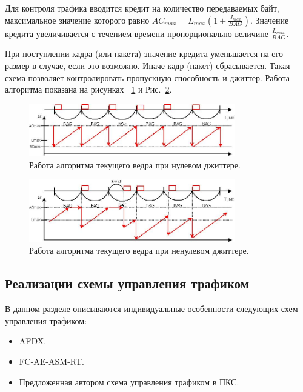 \documentclass[12pt, a4paper]{article}
\begin{document}
Для контроля трафика вводится кредит на количество передаваемых байт, максимальное значение которого равно $AC_{max} = L_{max}(1 + \frac{J_{max}}{BAG})$. Значение
кредита увеличивается с течением времени пропорционально величине $\frac{L_{max}}{BAG}$.

При поступлении кадра (или пакета) значение кредита уменьшается на его размер в случае, если это возможно. Иначе кадр (пакет) сбрасывается. Такая схема позволяет контролировать пропускную способность и джиттер. Работа алгоритма показана на рисунках ~\ref{pic:scheme:nojit} и Рис.~\ref{pic:scheme:jit}.

\begin{figure}[h!]
	\centering
	\includegraphics[width=0.80\textwidth]{img/nojit.png}
	\caption[russian]{Работа алгоритма текущего ведра при нулевом джиттере.}
	\label{pic:scheme:nojit}
\end{figure}

\begin{figure}[h!]
	\centering
	\includegraphics[width=0.80\textwidth]{img/jit.png}
	\caption{Работа алгоритма текущего ведра при ненулевом джиттере.}
	\label{pic:scheme:jit}
\end{figure}

\subsection{Реализации схемы управления трафиком}
В данном разделе описываются индивидуальные особенности следующих схем управления трафиком:
\begin{itemize}
	\item AFDX.
	\item FC-AE-ASM-RT.
	\item Предложенная автором схема управления трафиком в ПКС.
\end{itemize}
\end{document}
